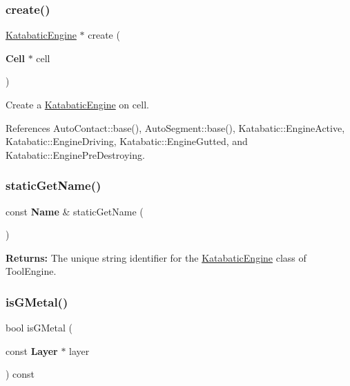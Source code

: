\subsubsection{\texorpdfstring{create()}{create()}}
{\footnotesize\ttfamily \hyperlink{classKatabatic_1_1KatabaticEngine}{Katabatic\+Engine} $\ast$ create (\begin{DoxyParamCaption}\item[{\textbf{ Cell} $\ast$}]{cell }\end{DoxyParamCaption})\hspace{0.3cm}{\ttfamily [static]}}

Create a \hyperlink{classKatabatic_1_1KatabaticEngine}{Katabatic\+Engine} on {\ttfamily cell}. 

References Auto\+Contact\+::base(), Auto\+Segment\+::base(), Katabatic\+::\+Engine\+Active, Katabatic\+::\+Engine\+Driving, Katabatic\+::\+Engine\+Gutted, and Katabatic\+::\+Engine\+Pre\+Destroying.

\mbox{\label{classKatabatic_1_1KatabaticEngine_a802eee6265da8d536db52d412f8a4afd}} 
\subsubsection{\texorpdfstring{static\+Get\+Name()}{staticGetName()}}
{\footnotesize\ttfamily const \textbf{ Name} \& static\+Get\+Name (\begin{DoxyParamCaption}{ }\end{DoxyParamCaption})\hspace{0.3cm}{\ttfamily [static]}}

{\bfseries Returns\+:} The unique string identifier for the \hyperlink{classKatabatic_1_1KatabaticEngine}{Katabatic\+Engine} class of Tool\+Engine. \mbox{\label{classKatabatic_1_1KatabaticEngine_a83a7793270669d2669222eac2caa7f93}} 
\subsubsection{\texorpdfstring{is\+G\+Metal()}{isGMetal()}}
{\footnotesize\ttfamily bool is\+G\+Metal (\begin{DoxyParamCaption}\item[{const \textbf{ Layer} $\ast$}]{layer }\end{DoxyParamCaption}) const\hspace{0.3cm}{\ttfamily [inline]}}

